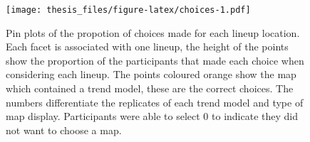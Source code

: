 \documentclass{monashthesis}
\begin{document}
\begin{figure}
\centering
\texttt{[image: thesis\_files/figure-latex/choices-1.pdf]}
\caption{\label{fig:choices}Pin plots of the propotion of choices made for each lineup location. Each facet is associated with one lineup, the height of the points show the proportion of the participants that made each choice when considering each lineup. The points coloured orange show the map which contained a trend model, these are the correct choices. The numbers differentiate the replicates of each trend model and type of map display. Participants were able to select 0 to indicate they did not want to choose a map.}
\end{figure}

\begin{Shaded}
\begin{Highlighting}[]
\StringTok{ }\OperatorTok{%
\StringTok{  }\KeywordTok{count}\NormalTok{(trend, type, choice, replicate, choice, detect) }\OperatorTok{%
\StringTok{  }\KeywordTok{group_by}\NormalTok{(trend, type, replicate) }\OperatorTok{%
\StringTok{  }\KeywordTok{mutate}\NormalTok{(}\DataTypeTok{prop =} \KeywordTok{as.character}\NormalTok{(}\KeywordTok{round}\NormalTok{(n}\OperatorTok{/}\KeywordTok{sum}\NormalTok{(n), }\DecValTok{2}\NormalTok{))) }\OperatorTok{%
\StringTok{  }\KeywordTok{rowwise}\NormalTok{() }\OperatorTok{%
\StringTok{  }\KeywordTok{mutate}\NormalTok{(}\DataTypeTok{prop =} \KeywordTok{ifelse}\NormalTok{(}\KeywordTok{nchar}\NormalTok{(prop)}\OperatorTok{==}\DecValTok{3}\NormalTok{, }\KeywordTok{paste0}\NormalTok{(prop,}\DecValTok{0}\NormalTok{), prop)) }\OperatorTok{%
\StringTok{  }\KeywordTok{mutate}\NormalTok{(}\DataTypeTok{repl =} \KeywordTok{paste}\NormalTok{(}\StringTok{"Rep:"}\NormalTok{, replicate, }\StringTok{":}\CharTok{\textbackslash{}n}\StringTok{"}\NormalTok{, type,  }\DataTypeTok{sep =} \StringTok{""}\NormalTok{)) }\OperatorTok{%
\StringTok{  }\KeywordTok{mutate}\NormalTok{(}\DataTypeTok{bottom =} \DecValTok{0}\NormalTok{) }\OperatorTok{%
\StringTok{  }\KeywordTok{select}\NormalTok{(}\DataTypeTok{Trend =}\NormalTok{ trend, }\DataTypeTok{Rep =}\NormalTok{ replicate, }\DataTypeTok{Type =}\NormalTok{ type, prop, choice) }\OperatorTok{%
\StringTok{  }\KeywordTok{spread}\NormalTok{(choice, prop, }\DataTypeTok{fill =} \StringTok{"0.00"}\NormalTok{) }\OperatorTok{%
\StringTok{  }\KeywordTok{nest}\NormalTok{(}\DataTypeTok{data =} \KeywordTok{c}\NormalTok{(Rep, Type, }\StringTok{`}\DataTypeTok{0}\StringTok{`}\NormalTok{, }\StringTok{`}\DataTypeTok{1}\StringTok{`}\NormalTok{, }\StringTok{`}\DataTypeTok{2}\StringTok{`}\NormalTok{, }\StringTok{`}\DataTypeTok{3}\StringTok{`}\NormalTok{, }\StringTok{`}\DataTypeTok{4}\StringTok{`}\NormalTok{, }\StringTok{`}\DataTypeTok{5}\StringTok{`}\NormalTok{, }\StringTok{`}\DataTypeTok{6}\StringTok{`}\NormalTok{, }\StringTok{`}\DataTypeTok{7}\StringTok{`}\NormalTok{, }\StringTok{`}\DataTypeTok{8}\StringTok{`}\NormalTok{, }\StringTok{`}\DataTypeTok{9}\StringTok{`}\NormalTok{, }
}}}}}}}}}}
\end{Highlighting}
\end{Shaded}
\end{document}
